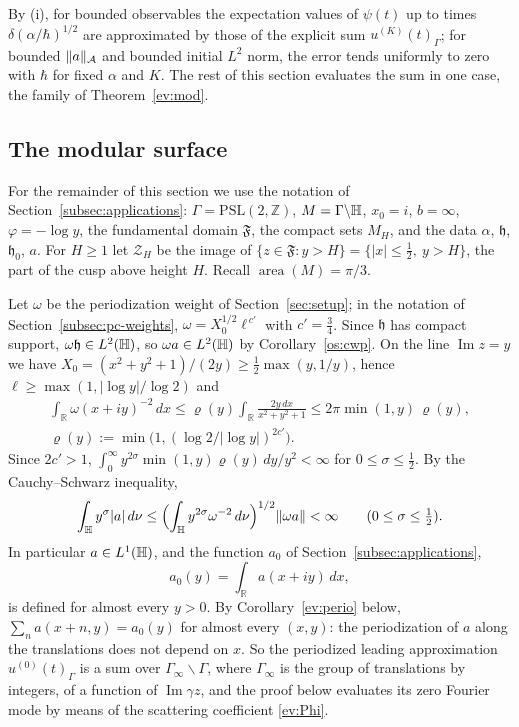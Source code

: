 By (i), for bounded observables the expectation values of $\psi(t)$ up to times $\delta(\alpha/\hbar)^{1/2}$ are approximated by
those of the explicit sum $u^{(K)}(t)_\Gamma$; for bounded $\lVert a\rVert_{\mathcal A}$ and bounded initial $L^2$ norm, the error tends uniformly
to zero with $\hbar$ for fixed $\alpha$ and $K$. The rest of this section evaluates the sum in one case, the family of
Theorem~\ref{ev:mod}.

\subsection{The modular surface}\label{subsec:ev-mod}
For the remainder of this section we use the notation of Section~\ref{subsec:applications}: $\Gamma=\mathrm{PSL}(2,\mathbb Z)$,
$M=\Gamma\backslash\mathbb{H}$, $x_0=i$, $b=\infty$, $\varphi=-\log y$, the fundamental domain $\mathfrak F$, the compact sets $M_H$, and the data
$\alpha$, $\mathfrak h$, $\mathfrak h_0$, $a$. For $H\ge1$ let $\mathcal Z_H$ be the image of $\{z\in\mathfrak F:y>H\}=\{|x|\le\tfrac12,\ y>H\}$, the part of the cusp above
height $H$. Recall $\operatorname{area}(M)=\pi/3$.

Let $\omega$ be the periodization weight of Section~\ref{sec:setup}; in the notation of Section~\ref{subsec:pc-weights},
$\omega=X_0^{1/2}\ell^{\,c'}$ with $c'=\tfrac34$.
Since $\mathfrak h$ has compact support, $\omega \mathfrak h\in L^2(\mathbb{H})$, so $\omega a\in L^2(\mathbb{H})$ by
Corollary~\ref{os:cwp}. On the line $\operatorname{Im}z=y$ we have $X_0=(x^2+y^2+1)/(2y)\ge\tfrac12\max(y,1/y)$, hence $\ell\ge\max(1,|\log y|/\log2)$ and
\begin{equation}\label{ev:line}
\begin{gathered}
  \int_{\mathbb R}\omega(x+iy)^{-2}\,dx\le\varrho(y)\int_{\mathbb R}\frac{2y\,dx}{x^2+y^2+1}\le2\pi\min(1,y)\,\varrho(y),\\
  \varrho(y):=\min\bigl(1,(\log2/|\log y|)^{2c'}\bigr).
\end{gathered}
\end{equation}
Since $2c'>1$, $\int_0^\infty y^{2\sigma}\min(1,y)\varrho(y)\,dy/y^2<\infty$ for $0\le\sigma\le\tfrac12$. By the Cauchy--Schwarz inequality,
\begin{equation}\label{ev:L1}
  \int_{\mathbb{H}} y^{\sigma}|a|\,d\nu\le\Bigl(\int_{\mathbb{H}} y^{2\sigma}\omega^{-2}\,d\nu\Bigr)^{1/2}\lVert \omega a\rVert<\infty\qquad(0\le\sigma\le\tfrac12).
\end{equation}
In particular $a\in L^1(\mathbb{H})$, and the function $a_0$ of Section~\ref{subsec:applications},
\begin{equation}\label{ev:a0}
  a_0(y)=\int_{\mathbb R}a(x+iy)\,dx,
\end{equation}
is defined for almost every $y>0$. By Corollary~\ref{ev:perio} below, $\sum_{n}a(x+n,y)=a_0(y)$ for almost every $(x,y)$: the
periodization of $a$ along the translations does not depend on $x$. So the periodized leading approximation
$u^{(0)}(t)_\Gamma$ is a sum over $\Gamma_\infty\backslash\Gamma$, where $\Gamma_\infty$ is the group of translations by integers, of a
function of $\operatorname{Im}\gamma z$, and the proof below
evaluates its zero Fourier mode by means of the scattering coefficient \eqref{ev:Phi}.

